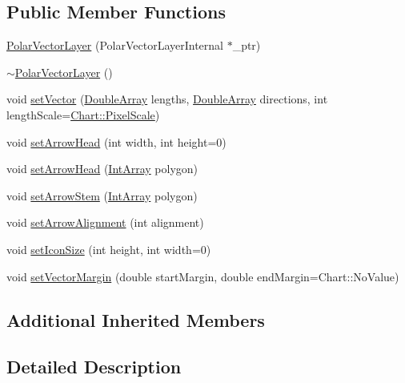 \subsection*{Public Member Functions}
\begin{DoxyCompactItemize}
\item 
\hyperlink{class_polar_vector_layer_a10f08e3422028b22a2cf862689c58223}{Polar\+Vector\+Layer} (Polar\+Vector\+Layer\+Internal $\ast$\+\_\+ptr)
\item 
\hyperlink{class_polar_vector_layer_a2eeb923b926edfc76a764f68f711187e}{$\sim$\+Polar\+Vector\+Layer} ()
\item 
void \hyperlink{class_polar_vector_layer_a519151c26677acbcde525cac0964f5b3}{set\+Vector} (\hyperlink{class_double_array}{Double\+Array} lengths, \hyperlink{class_double_array}{Double\+Array} directions, int length\+Scale=\hyperlink{namespace_chart_af8005281e1fb57d737e9f89b13605808afebebf69a28e58958dc5f9da3ece2147}{Chart\+::\+Pixel\+Scale})
\item 
void \hyperlink{class_polar_vector_layer_a739707bfc211f48475c65decff37ffb9}{set\+Arrow\+Head} (int width, int height=0)
\item 
void \hyperlink{class_polar_vector_layer_ac4ef85f3b4cc335f7dba877989ca5ea0}{set\+Arrow\+Head} (\hyperlink{class_int_array}{Int\+Array} polygon)
\item 
void \hyperlink{class_polar_vector_layer_a7b3681c192109aa5d4085d625c4bee7c}{set\+Arrow\+Stem} (\hyperlink{class_int_array}{Int\+Array} polygon)
\item 
void \hyperlink{class_polar_vector_layer_ad1005201a39bf1fe8922b18a315d2d4d}{set\+Arrow\+Alignment} (int alignment)
\item 
void \hyperlink{class_polar_vector_layer_a37700e57ce3ce0b6deda4782112b56c9}{set\+Icon\+Size} (int height, int width=0)
\item 
void \hyperlink{class_polar_vector_layer_af632962b27285ff43ce920aecf6111f5}{set\+Vector\+Margin} (double start\+Margin, double end\+Margin=Chart\+::\+No\+Value)
\end{DoxyCompactItemize}
\subsection*{Additional Inherited Members}


\subsection{Detailed Description}


